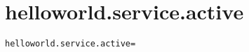 \section{helloworld.service.active}
\label{configuration:HelloworldServiceActive}
\ClearAPI
\TODO
\begin{lstlisting}[style=Props,caption={Usage example for \textit{helloworld.service.active}}]
helloworld.service.active=
\end{lstlisting}
